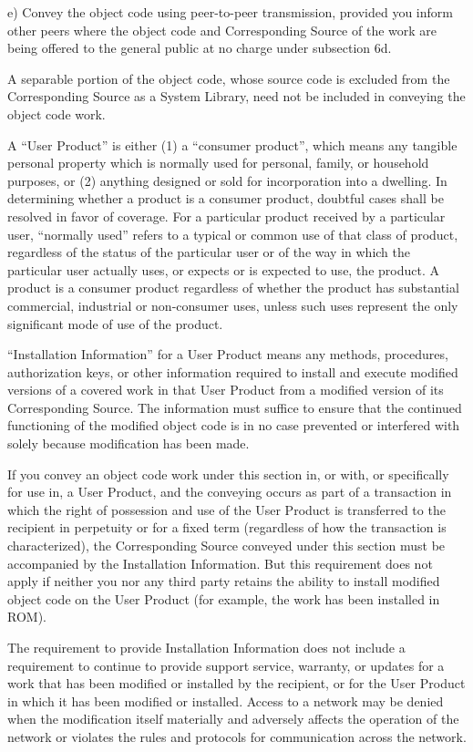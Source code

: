 \documentclass[letterpaper,10pt,english]{sphinxmanual}
\begin{document}
e) Convey the object code using peer-to-peer transmission, provided
you inform other peers where the object code and Corresponding
Source of the work are being offered to the general public at no
charge under subsection 6d.

A separable portion of the object code, whose source code is excluded
from the Corresponding Source as a System Library, need not be
included in conveying the object code work.

A ``User Product'' is either (1) a ``consumer product'', which means any
tangible personal property which is normally used for personal, family,
or household purposes, or (2) anything designed or sold for incorporation
into a dwelling.  In determining whether a product is a consumer product,
doubtful cases shall be resolved in favor of coverage.  For a particular
product received by a particular user, ``normally used'' refers to a
typical or common use of that class of product, regardless of the status
of the particular user or of the way in which the particular user
actually uses, or expects or is expected to use, the product.  A product
is a consumer product regardless of whether the product has substantial
commercial, industrial or non-consumer uses, unless such uses represent
the only significant mode of use of the product.

``Installation Information'' for a User Product means any methods,
procedures, authorization keys, or other information required to install
and execute modified versions of a covered work in that User Product from
a modified version of its Corresponding Source.  The information must
suffice to ensure that the continued functioning of the modified object
code is in no case prevented or interfered with solely because
modification has been made.

If you convey an object code work under this section in, or with, or
specifically for use in, a User Product, and the conveying occurs as
part of a transaction in which the right of possession and use of the
User Product is transferred to the recipient in perpetuity or for a
fixed term (regardless of how the transaction is characterized), the
Corresponding Source conveyed under this section must be accompanied
by the Installation Information.  But this requirement does not apply
if neither you nor any third party retains the ability to install
modified object code on the User Product (for example, the work has
been installed in ROM).

The requirement to provide Installation Information does not include a
requirement to continue to provide support service, warranty, or updates
for a work that has been modified or installed by the recipient, or for
the User Product in which it has been modified or installed.  Access to a
network may be denied when the modification itself materially and
adversely affects the operation of the network or violates the rules and
protocols for communication across the network.
\end{document}
